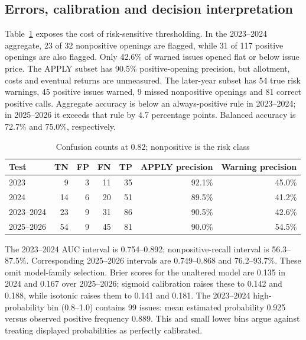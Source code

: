 \documentclass[runningheads]{llncs}
\begin{document}
\subsection{Errors, calibration and decision interpretation}
Table~\ref{tab:confusion} exposes the cost of risk-sensitive thresholding. In the 2023--2024 aggregate, 23 of 32 nonpositive openings are flagged, while 31 of 117 positive openings are also flagged. Only 42.6\% of warned issues opened flat or below issue price. The APPLY subset has 90.5\% positive-opening precision, but allotment, costs and eventual returns are unmeasured. The later-year subset has 54 true risk warnings, 45 positive issues warned, 9 missed nonpositive openings and 81 correct positive calls. Aggregate accuracy is below an always-positive rule in 2023--2024; in 2025--2026 it exceeds that rule by 4.7 percentage points. Balanced accuracy is 72.7\% and 75.0\%, respectively.
\begin{table}[tb]
\caption{Confusion counts at 0.82; nonpositive is the risk class}\label{tab:confusion}
\centering\small
\begin{tabular}{@{}lrrrrrr@{}}\toprule
Test & TN & FP & FN & TP & APPLY precision & Warning precision\\\midrule
2023 & 9 & 3 & 11 & 35 & 92.1\% & 45.0\%\\
2024 & 14 & 6 & 20 & 51 & 89.5\% & 41.2\%\\
2023--2024 & 23 & 9 & 31 & 86 & 90.5\% & 42.6\%\\
2025--2026 & 54 & 9 & 45 & 81 & 90.0\% & 54.5\%\\\bottomrule
\end{tabular}
\end{table}
The 2023--2024 AUC interval is 0.754--0.892; nonpositive-recall interval is 56.3--87.5\%. Corresponding 2025--2026 intervals are 0.749--0.868 and 76.2--93.7\%. These omit model-family selection. Brier scores for the unaltered model are 0.135 in 2024 and 0.167 over 2025--2026; sigmoid calibration raises these to 0.142 and 0.188, while isotonic raises them to 0.141 and 0.181. The 2023--2024 high-probability bin (0.8--1.0) contains 99 issues: mean estimated probability 0.925 versus observed positive frequency 0.889. This and small lower bins argue against treating displayed probabilities as perfectly calibrated.
\end{document}
